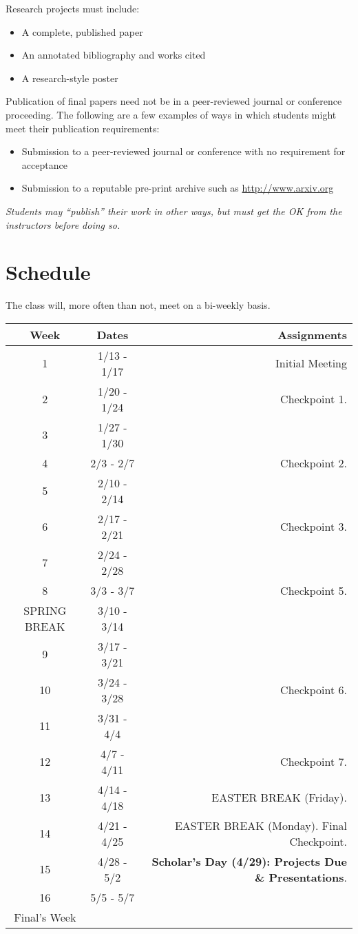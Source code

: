 \documentclass[10pt]{article}
\begin{document}
Research projects must include:
\begin{itemize}
\item A complete, published paper 
\item An annotated bibliography and works cited
\item A research-style poster
\end{itemize}

Publication of final papers need not be in a peer-reviewed journal or conference proceeding.  The following are a few examples of ways in which students might meet their publication requirements:
\begin{itemize}
\item Submission to a peer-reviewed journal or conference with no requirement for acceptance
\item Submission to a reputable pre-print archive such as \url{http://www.arxiv.org}
\end{itemize}
\textit{Students may ``publish'' their work in other ways, but must get the OK from the instructors before doing so.}

\section{Schedule}

The class will, more often than not, meet on a bi-weekly basis.
\begin{center}
\begin{tabular}{|c|c|r|}
\hline 
Week & Dates & Assignments \\
\hline
1 & 1/13 - 1/17 &  Initial Meeting\\
\hline
2 & 1/20 - 1/24 & Checkpoint 1.\\
\hline
3 & 1/27 - 1/30 &  \\
\hline
4 & 2/3 - 2/7 & Checkpoint 2.  \\
\hline
5 & 2/10 - 2/14 & \\
\hline
6 & 2/17 - 2/21 & Checkpoint 3. \\
\hline
7 & 2/24 - 2/28 & \\
\hline
8 & 3/3 - 3/7 & Checkpoint 5.  \\
\hline 
SPRING BREAK & 3/10 - 3/14& \\
\hline
9 & 3/17 - 3/21 &  \\
\hline
10 & 3/24 - 3/28 & Checkpoint 6. \\
\hline
11 & 3/31 - 4/4 &  \\
\hline
12 & 4/7 - 4/11 & Checkpoint 7. \\
\hline
13 & 4/14 - 4/18 &  EASTER BREAK (Friday).\\
\hline
14 & 4/21 - 4/25 & EASTER BREAK (Monday). Final Checkpoint. \\
\hline
15 & 4/28 - 5/2 & \textbf{Scholar's Day (4/29): Projects Due \& Presentations}. \\ 
\hline
16 & 5/5 - 5/7 & \\
\hline
Final's Week &  &  \\ 
\hline
\end{tabular}
\end{center}
\end{document}

